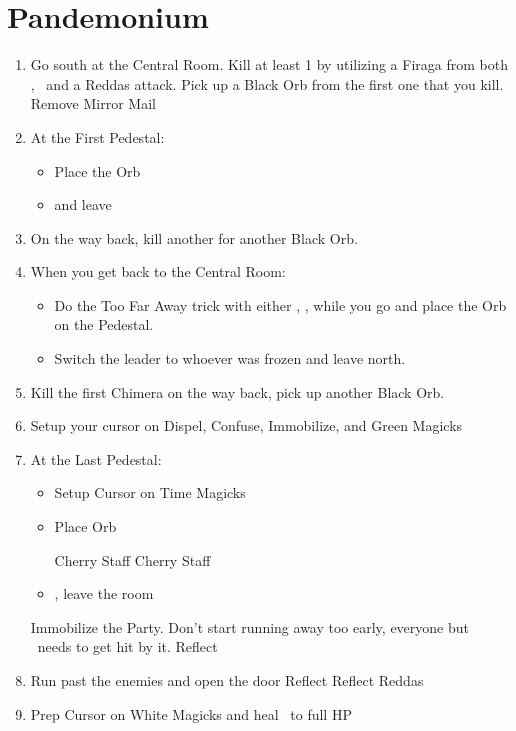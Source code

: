 \chapter{Pandemonium}
\begin{enumerate}
\item Go south at the Central Room. Kill at least 1  by utilizing a Firaga from both \ashe, \penelo\ and a Reddas attack. Pick up a Black Orb from the first one that you kill.
\vaanf Remove Mirror Mail
\item At the First Pedestal:
\begin{itemize}
\ashef cure \vaan\ or Reddas
\item Place the Orb
\item \leader{\ashe} and leave
\end{itemize}
\item On the way back, kill another  for another Black Orb.
\item When you get back to the Central Room:
\begin{itemize}
	\item Do the Too Far Away trick with either \ashe, \penelo, while you go and place the Orb on the Pedestal.
	\item Switch the leader to whoever was frozen and leave north.
\end{itemize}
\item Kill the first Chimera on the way back, pick up another Black Orb.
\item Setup your cursor on Dispel, Confuse, Immobilize, and Green Magicks
\item At the Last Pedestal:
\begin{itemize}
	\vaanf Protect \vaan
	\item Setup Cursor on Time Magicks
	\item Place Orb
	\begin{equip}
	\begin{itemize}
	\optimize{\vaan}
	\penelof Cherry Staff
	\ashef Cherry Staff
	\end{itemize}
	\end{equip}
		      \begin{gambit}
			      \begin{itemize}
				      \charactergambit[Off]{\ashe}{\gambitline{Ally: \ \ashe\ \ }{Reflect}}{\gambitline{Ally: \ \ashe\ \ }{(Aerora)}}
			      \end{itemize}
		      \end{gambit}
		      \item \leader{\vaan}, leave the room
\end{itemize}
\penelof Immobilize the Party. Don't start running away too early, everyone but \vaan\ needs to get hit by it.
\ashef Reflect \ashe
\item Run past the enemies and open the door
\penelof Reflect \penelo
\ashef Reflect Reddas
\gambiton{\ashe}
\item Prep Cursor on White Magicks and heal \vaan\ to full HP
\end{enumerate}
